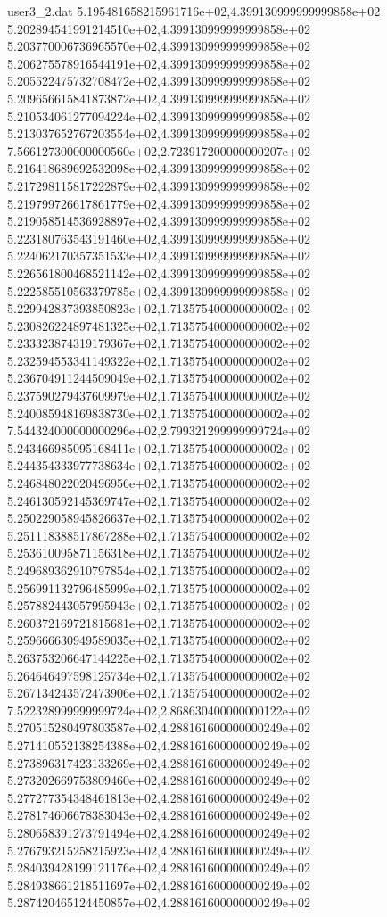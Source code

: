 \begin{filecontents}{user3_2.dat}
5.195481658215961716e+02,4.399130999999999858e+02
5.202894541991214510e+02,4.399130999999999858e+02
5.203770006736965570e+02,4.399130999999999858e+02
5.206275578916544191e+02,4.399130999999999858e+02
5.205522475732708472e+02,4.399130999999999858e+02
5.209656615841873872e+02,4.399130999999999858e+02
5.210534061277094224e+02,4.399130999999999858e+02
5.213037652767203554e+02,4.399130999999999858e+02
7.566127300000000560e+02,2.723917200000000207e+02
5.216418689692532098e+02,4.399130999999999858e+02
5.217298115817222879e+02,4.399130999999999858e+02
5.219799726617861779e+02,4.399130999999999858e+02
5.219058514536928897e+02,4.399130999999999858e+02
5.223180763543191460e+02,4.399130999999999858e+02
5.224062170357351533e+02,4.399130999999999858e+02
5.226561800468521142e+02,4.399130999999999858e+02
5.222585510563379785e+02,4.399130999999999858e+02
5.229942837393850823e+02,1.713575400000000002e+02
5.230826224897481325e+02,1.713575400000000002e+02
5.233323874319179367e+02,1.713575400000000002e+02
5.232594553341149322e+02,1.713575400000000002e+02
5.236704911244509049e+02,1.713575400000000002e+02
5.237590279437609979e+02,1.713575400000000002e+02
5.240085948169838730e+02,1.713575400000000002e+02
7.544324000000000296e+02,2.799321299999999724e+02
5.243466985095168411e+02,1.713575400000000002e+02
5.244354333977738634e+02,1.713575400000000002e+02
5.246848022020496956e+02,1.713575400000000002e+02
5.246130592145369747e+02,1.713575400000000002e+02
5.250229058945826637e+02,1.713575400000000002e+02
5.251118388517867288e+02,1.713575400000000002e+02
5.253610095871156318e+02,1.713575400000000002e+02
5.249689362910797854e+02,1.713575400000000002e+02
5.256991132796485999e+02,1.713575400000000002e+02
5.257882443057995943e+02,1.713575400000000002e+02
5.260372169721815681e+02,1.713575400000000002e+02
5.259666630949589035e+02,1.713575400000000002e+02
5.263753206647144225e+02,1.713575400000000002e+02
5.264646497598125734e+02,1.713575400000000002e+02
5.267134243572473906e+02,1.713575400000000002e+02
7.522328999999999724e+02,2.868630400000000122e+02
5.270515280497803587e+02,4.288161600000000249e+02
5.271410552138254388e+02,4.288161600000000249e+02
5.273896317423133269e+02,4.288161600000000249e+02
5.273202669753809460e+02,4.288161600000000249e+02
5.277277354348461813e+02,4.288161600000000249e+02
5.278174606678383043e+02,4.288161600000000249e+02
5.280658391273791494e+02,4.288161600000000249e+02
5.276793215258215923e+02,4.288161600000000249e+02
5.284039428199121176e+02,4.288161600000000249e+02
5.284938661218511697e+02,4.288161600000000249e+02
5.287420465124450857e+02,4.288161600000000249e+02

\end{filecontents}
